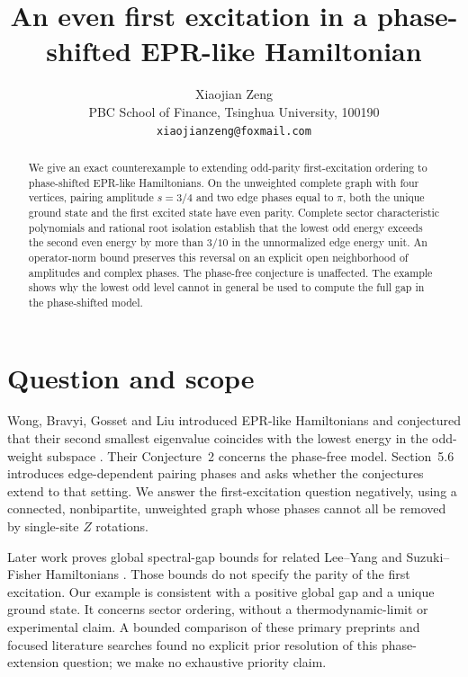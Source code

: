 \documentclass[11pt]{article}
\title{An even first excitation in a phase-shifted EPR-like Hamiltonian}
\author{Xiaojian Zeng\\\small PBC School of Finance, Tsinghua University, 100190\\\small\texttt{xiaojianzeng@foxmail.com}}
\date{}
\begin{document}
\maketitle
\begin{abstract}
We give an exact counterexample to extending odd-parity first-excitation ordering to phase-shifted EPR-like Hamiltonians. On the unweighted complete graph with four vertices, pairing amplitude $s=3/4$ and two edge phases equal to $\pi$, both the unique ground state and the first excited state have even parity. Complete sector characteristic polynomials and rational root isolation establish that the lowest odd energy exceeds the second even energy by more than $3/10$ in the unnormalized edge energy unit. An operator-norm bound preserves this reversal on an explicit open neighborhood of amplitudes and complex phases. The phase-free conjecture is unaffected. The example shows why the lowest odd level cannot in general be used to compute the full gap in the phase-shifted model.
\end{abstract}

\section{Question and scope}
Wong, Bravyi, Gosset and Liu introduced EPR-like Hamiltonians and conjectured that their second smallest eigenvalue coincides with the lowest energy in the odd-weight subspace \cite{Wong2026}. Their Conjecture~2 concerns the phase-free model. Section~5.6 introduces edge-dependent pairing phases and asks whether the conjectures extend to that setting. We answer the first-excitation question negatively, using a connected, nonbipartite, unweighted graph whose phases cannot all be removed by single-site $Z$ rotations.

Later work proves global spectral-gap bounds for related Lee--Yang and Suzuki--Fisher Hamiltonians \cite{Bravyi2026,Rayudu2026,Hofgard2026}. Those bounds do not specify the parity of the first excitation. Our example is consistent with a positive global gap and a unique ground state. It concerns sector ordering, without a thermodynamic-limit or experimental claim. A bounded comparison of these primary preprints and focused literature searches found no explicit prior resolution of this phase-extension question; we make no exhaustive priority claim.
\end{document}
